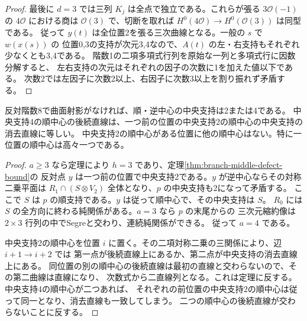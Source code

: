 \begin{proof}
最後に $d=3$ では三列 $K_j$ は全点で独立である。これらが張る $3\mathcal O(-1)$ の
$4\mathcal O$ における商は $\mathcal O(3)$ で、切断を取れば
$H^0(4\mathcal O)\to H^0(\mathcal O(3))$ は同型である。
従って $y(t)$ は全位置2を張る三次曲線となる。一般の $s$ で $w(x(s))$ の
位置0,3の支持が次元3,4なので、$A(t)$ の左・右支持もそれぞれ少なくとも3,4である。
階数1の二項多項式行列を原始な一列と多項式行に因数分解すると、
左右支持の次元はそれぞれの因子の次数に1を加えた値以下である。
次数2では左因子に次数2以上、右因子に次数3以上を割り振れず矛盾する。
\end{proof}

\begin{corollary}\label{cor:rank-eight-center-types}
反対階数8で曲面射影がなければ、順・逆中心の中央支持は2または4である。
中央支持4の順中心の後続直線は、一つ前の位置の中央支持2の順中心の中央支持の消去直線に等しい。
中央支持2の順中心がある位置に他の順中心はない。特に一位置の順中心は高々一つである。
\end{corollary}
\begin{proof}
$a\ge3$ なら定理により $h=3$ であり、定理\ref{thm:branch-middle-defect-bound}の
反対点 $y$ は一つ前の位置で中央支持2である。$y$ が逆中心ならその対称二乗平面は
$R_1\cap(S\otimes V_2)$ 全体となり、$p$ の中央支持も2になって矛盾する。
ここで $S$ は $p$ の順支持である。$y$ は従って順中心で、その中央支持は $S$。
$R_0$ には $S$ の全方向に終わる純関係がある。$a=3$ なら $p$ の末尾からの
三次元縮約像は $2\times3$ 行列の中でSegreと交わり、連続純関係ができる。
従って $a=4$ である。

中央支持2の順中心を位置 $i$ に置く。その二項対称二乗の三関係により、辺 $i+1\to i+2$ では
第一点が後続直線上にあるか、第二点が中央支持の消去直線上にある。
同位置の別の順中心の後続直線は最初の直線と交わらないので、その第二曲線は直線になり、
次数式から二直線列となる。これは定理に反する。中央支持4の順中心が二つあれば、
それぞれの前位置の中央支持2の順中心は従って同一となり、消去直線も一致してしまう。
二つの順中心の後続直線が交わらないことに反する。
\end{proof}
